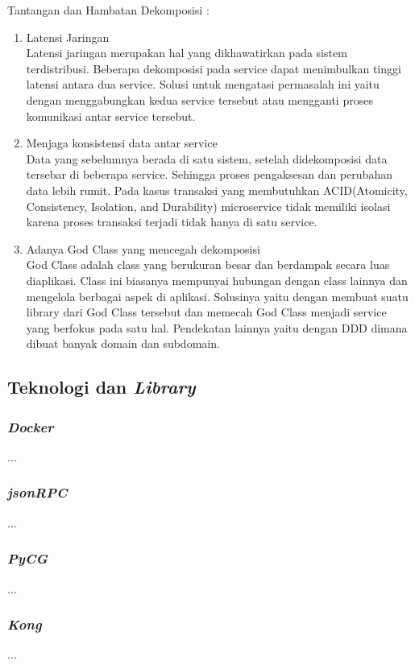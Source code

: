 Tantangan dan Hambatan Dekomposisi \cite{1C7}:
\begin{enumerate}[leftmargin=1.3cm]
	\item Latensi Jaringan\\
		  Latensi jaringan merupakan hal yang dikhawatirkan pada sistem terdistribusi. Beberapa dekomposisi pada service dapat menimbulkan tinggi latensi antara dua service. Solusi untuk mengatasi permasalah ini yaitu dengan menggabungkan kedua service tersebut atau mengganti proses komunikasi antar service tersebut.
	\item Menjaga konsistensi data antar service\\
		  Data yang sebelumnya berada di satu sistem, setelah didekomposisi data tersebar di beberapa service. Sehingga proses pengaksesan dan perubahan data lebih rumit. Pada kasus transaksi yang membutuhkan ACID(Atomicity, Consistency, Isolation, and Durability) microservice tidak memiliki isolasi karena proses transaksi terjadi tidak hanya di satu service.
	\item Adanya God Class yang mencegah dekomposisi\\
		  God Class adalah class yang berukuran besar dan berdampak secara luas diaplikasi. Class ini biasanya mempunyai hubungan dengan class lainnya dan mengelola berbagai aspek di aplikasi. Solusinya yaitu dengan membuat suatu library dari God Class tersebut dan memecah God Class menjadi service yang berfokus pada satu hal. Pendekatan lainnya yaitu dengan DDD dimana dibuat banyak domain dan subdomain.
\end{enumerate}	

\subsection{Teknologi dan \textit{Library}}
\subsubsection{\textit{Docker}}
...
\\
\subsubsection{\textit{jsonRPC}}
...
\\
\subsubsection{\textit{PyCG}}
...
\\
\subsubsection{\textit{Kong}}
...
\\
